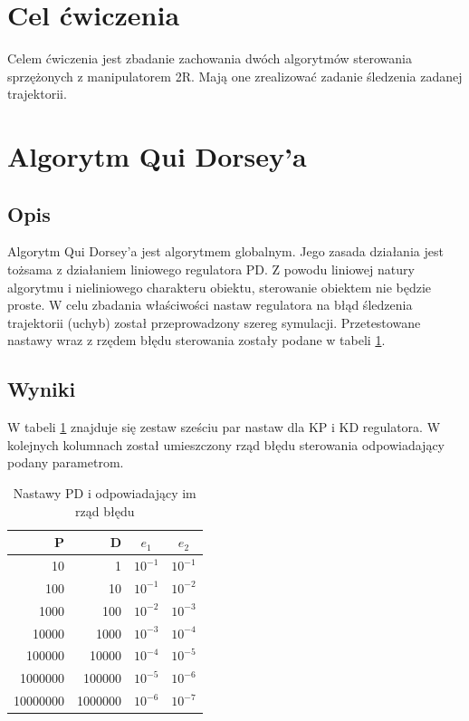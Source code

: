 \documentclass[12pt,a4paper]{article}
\begin{document}
\pdfpageheight   297mm
\pdfpagewidth    210mm

\StronaTytulowa
\SpisTresci

\pagebreak

\section{Cel ćwiczenia}
  Celem ćwiczenia jest zbadanie zachowania dwóch algorytmów sterowania sprzężonych z manipulatorem 2R. Mają one zrealizować zadanie śledzenia zadanej trajektorii.

\section{Algorytm Qui Dorsey'a}
  \subsection{Opis} %
    Algorytm Qui Dorsey'a jest algorytmem globalnym. Jego zasada działania jest tożsama z działaniem liniowego regulatora PD. Z powodu liniowej natury algorytmu i nieliniowego charakteru obiektu, sterowanie obiektem nie będzie proste. W celu zbadania właściwości nastaw regulatora na błąd śledzenia trajektorii (uchyb) został przeprowadzony szereg symulacji. Przetestowane nastawy wraz z rzędem błędu sterowania zostały podane w tabeli \ref{table:1}.

  \subsection{Wyniki} %
    W tabeli \ref{table:1} znajduje się zestaw sześciu par nastaw dla KP i KD regulatora. W kolejnych kolumnach został umieszczony rząd błędu sterowania odpowiadający podany parametrom. 

  \begin{table}[h!]
    \centering
    \begin{tabular}{ r | r | c | c }
      P & D & $e_1$ & $e_2$  \\ 
      \hline
      10 & 1 & $10^{-1}$ & $10^{-1}$ \\  
      100 & 10 & $10^{-1}$ & $10^{-2}$ \\  
      1000 & 100 & $10^{-2}$ & $10^{-3}$ \\  
      10000 & 1000 & $10^{-3}$ & $10^{-4}$ \\  
      100000 & 10000 & $10^{-4}$ & $10^{-5}$ \\  
      1000000 & 100000 & $10^{-5}$ & $10^{-6}$ \\
      10000000 & 1000000 & $10^{-6}$ & $10^{-7}$
    \end{tabular}
    \caption{Nastawy PD i odpowiadający im rząd błędu}
    \label{table:1}
  \end{table}
\end{document}
